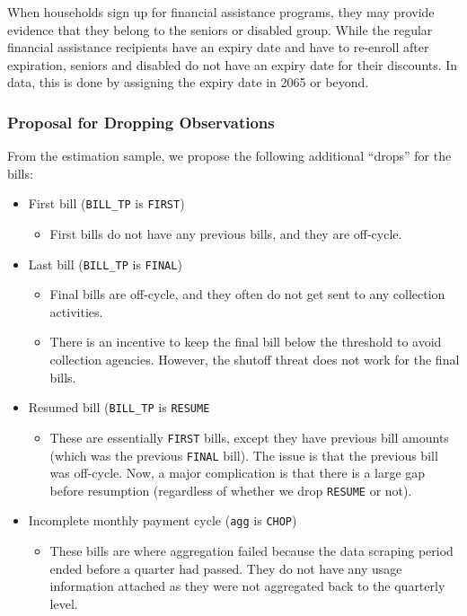 \documentclass[11pt]{article}
\begin{document}
When households sign up for financial assistance programs, they may provide evidence that they belong to the seniors or disabled group. While the regular financial assistance recipients have an expiry date and have to re-enroll after expiration, seniors and disabled do not have an expiry date for their discounts. In data, this is done by assigning the expiry date in 2065 or beyond.

\subsubsection*{Proposal for Dropping Observations}

From the estimation sample, we propose the following additional ``drops'' for the bills:
\begin{itemize}
	\item First bill (\texttt{BILL\_TP} is \texttt{FIRST})
	\begin{itemize}
		\item First bills do not have any previous bills, and they are off-cycle.
	\end{itemize}
	\item Last bill (\texttt{BILL\_TP} is \texttt{FINAL})
	\begin{itemize}
		\item Final bills are off-cycle, and they often do not get sent to any collection activities.
		\item There is an incentive to keep the final bill below the threshold to avoid collection agencies. However, the shutoff threat does not work for the final bills.
	\end{itemize}
	\item Resumed bill (\texttt{BILL\_TP} is \texttt{RESUME}
	\begin{itemize}
		\item These are essentially \texttt{FIRST} bills, except they have previous bill amounts (which was the previous \texttt{FINAL} bill). The issue is that the previous bill was off-cycle. Now, a major complication is that there is a large gap before resumption (regardless of whether we drop \texttt{RESUME} or not).
	\end{itemize}
	\item Incomplete monthly payment cycle (\texttt{agg} is \texttt{CHOP})
	\begin{itemize}
		\item These bills are where aggregation failed because the data scraping period ended before a quarter had passed. They do not have any usage information attached as they were not aggregated back to the quarterly level.

\end{itemize}
\end{itemize}
\end{document}
